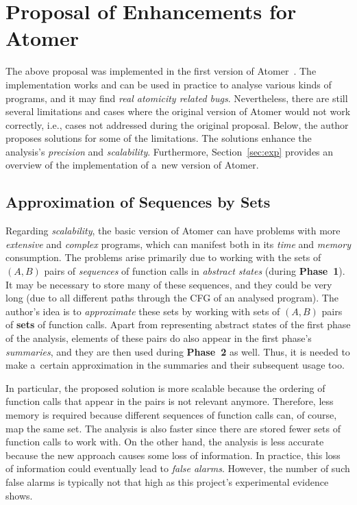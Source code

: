 \documentclass{ExcelAtFIT}
\theoremstyle{definition}
\begin{document}
\section{\hspace{-.15em}Proposal of Enhancements for Atomer}
\label{sec:proposal}

The above proposal was implemented in the first version of Atomer~\cite{harmimBP}. The implementation works and can be used in practice to analyse various kinds of programs, and it may find \emph{real atomicity related bugs}. Nevertheless, there are still several limitations and cases where the original version of Atomer would not work correctly, i.e., cases not addressed during the original proposal. Below, the author proposes solutions for some of the limitations. The solutions enhance the analysis's \emph{precision} and \emph{scalability}. Furthermore, Section~\ref{sec:exp} provides an overview of the implementation of a~new version of Atomer.

\subsection{Approximation of Sequences by Sets}

Regarding \emph{scalability}, the basic version of Atomer can have problems with more \emph{extensive} and \emph{complex} programs, which can manifest both in its \emph{time} and \emph{memory} consumption. The problems arise primarily due to working with the sets of ${ (A, B) }$ pairs of \emph{sequences} of function calls in \emph{abstract states} (during \textbf{Phase~1}). It may be necessary to store many of these sequences, and they could be very long (due to all different paths through the CFG of an analysed program). The author's idea is to \emph{approximate} these sets by working with sets of ${ (A, B) }$ pairs of \textbf{sets} of function calls. Apart from representing abstract states of the first phase of the analysis, elements of these pairs do also appear in the first phase's \emph{summaries}, and they are then used during \textbf{Phase~2} as well. Thus, it is needed to make a~certain approximation in the summaries and their subsequent usage too.

In particular, the proposed solution is more scalable because the ordering of function calls that appear in the pairs is not relevant anymore. Therefore, less memory is required because different sequences of function calls can, of course, map the same set. The analysis is also faster since there are stored fewer sets of function calls to work with. On the other hand, the analysis is less accurate because the new approach causes some loss of information. In practice, this loss of information could eventually lead to \emph{false alarms}. However, the number of such false alarms is typically not that high as this project's experimental evidence shows.
\end{document}
